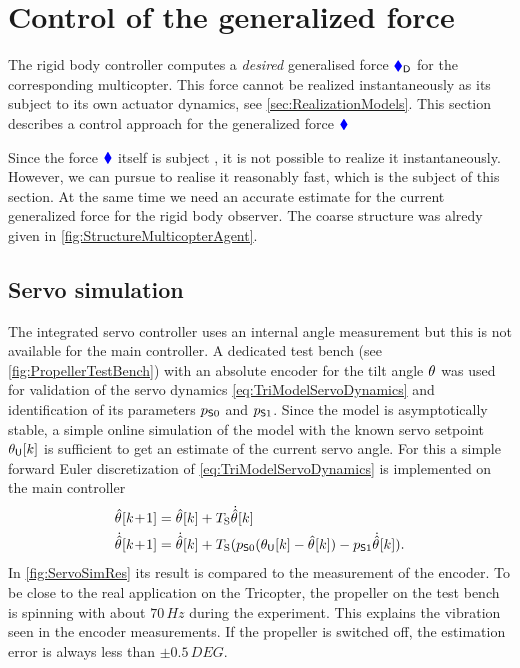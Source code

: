 \section{Control of the generalized force}\label{sec:RealizationForceVectorControl}
The rigid body controller computes a \textit{desired} generalised force $\genForceD$ for the corresponding multicopter.
This force cannot be realized instantaneously as its subject to its own actuator dynamics, see \autoref{sec:RealizationModels}.
This section describes a control approach for the generalized force $\genForce$

Since the force $\genForce$ itself is subject , it is not possible to realize it instantaneously.
However, we can pursue to realise it reasonably fast, which is the subject of this section.
At the same time we need an accurate estimate for the current generalized force for the rigid body observer.
The coarse structure was alredy given in \autoref{fig:StructureMulticopterAgent}.

\subsection{Servo simulation}
The integrated servo controller uses an internal angle measurement but this is not available for the main controller.
A dedicated test bench (see \autoref{fig:PropellerTestBench}) with an absolute encoder for the tilt angle $\aServo$ was used for validation of the servo dynamics \eqref{eq:TriModelServoDynamics} and identification of its parameters $\ServoParam[0]$ and $\ServoParam[1] $.
Since the model is asymptotically stable, a simple online simulation of the model with the known servo setpoint $\aServoU[][k]$ is sufficient to get an estimate of the current servo angle.
For this a simple forward Euler discretization of \eqref{eq:TriModelServoDynamics} is implemented on the main controller
\begin{subequations}\label{eq:ServoSimulator}
\begin{align}
 \aServoObs[][k\!+\!1] &= \aServoObs[][k] + \Ts \aServoObsd[][k]
\\
 \aServoObsd[][k\!+\!1] &= \aServoObsd[][k] + \Ts( \ServoParam[0] (\aServoU[][k] - \aServoObs[][k]) - \ServoParam[1] \aServoObsd[][k])
 .
\end{align}
\end{subequations}
In \autoref{fig:ServoSimRes} its result is compared to the measurement of the encoder.
To be close to the real application on the Tricopter, the propeller on the test bench is spinning with about $70\,\unit{Hz}$ during the experiment.
This explains the vibration seen in the encoder measurements.
If the propeller is switched off, the estimation error is always less than $\pm 0.5\,\unit{DEG}$.

